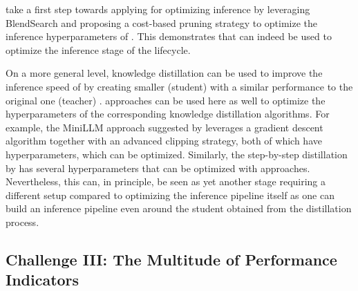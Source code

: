 \citet{wang-arxiv2023a} take a first step towards applying \AutoML for optimizing \LLM inference by leveraging BlendSearch \cite{wang-iclr2021a} and proposing a cost-based pruning strategy to optimize the inference hyperparameters of \LLMs. This demonstrates that \AutoML can indeed be used to optimize the inference stage of the \LLM lifecycle.

On a more general level, knowledge distillation can be used to improve the inference speed of \LLMs by creating smaller (student) \LLMs with a similar performance to the original one (teacher) \cite{gu-arxiv23a,hsieh-acl23a}. \AutoML approaches can be used here as well to optimize the hyperparameters of the corresponding knowledge distillation algorithms. For example, the MiniLLM approach suggested by \citet{gu-arxiv23a} leverages a gradient descent algorithm together with an advanced clipping strategy, both of which have hyperparameters, which can be optimized. Similarly, the step-by-step distillation by \citet{hsieh-acl23a} has several hyperparameters that can be optimized with \AutoML approaches. Nevertheless, this can, in principle, be seen as yet another stage requiring a different \AutoML setup compared to optimizing the inference pipeline itself as one can build an inference pipeline even around the student \LLM obtained from the distillation process.


\subsection{Challenge III: The Multitude of Performance Indicators}

